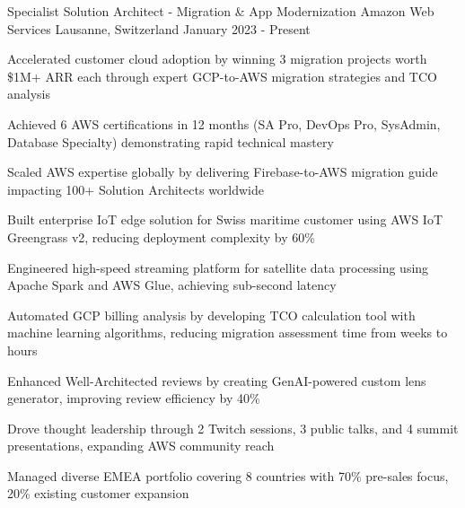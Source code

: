 \clearpage


\begin{cventries}
    \cventry
    {Specialist Solution Architect - Migration \& App Modernization} %
    {Amazon Web Services} %
    {Lausanne, Switzerland} %
    {January 2023 - Present} %
    {
        \begin{cvitems} %
		\item {Accelerated customer cloud adoption by winning 3 migration projects worth \$1M+ ARR each through expert GCP-to-AWS migration strategies and TCO analysis}
		\item {Achieved 6 AWS certifications in 12 months (SA Pro, DevOps Pro, SysAdmin, Database Specialty) demonstrating rapid technical mastery}
		\item {Scaled AWS expertise globally by delivering Firebase-to-AWS migration guide impacting 100+ Solution Architects worldwide}
		\item {Built enterprise IoT edge solution for Swiss maritime customer using AWS IoT Greengrass v2, reducing deployment complexity by 60\%}
		\item {Engineered high-speed streaming platform for satellite data processing using Apache Spark and AWS Glue, achieving sub-second latency}
		\item {Automated GCP billing analysis by developing TCO calculation tool with machine learning algorithms, reducing migration assessment time from weeks to hours}
		\item {Enhanced Well-Architected reviews by creating GenAI-powered custom lens generator, improving review efficiency by 40\%}
		\item {Drove thought leadership through 2 Twitch sessions, 3 public talks, and 4 summit presentations, expanding AWS community reach}
        \item {Managed diverse EMEA portfolio covering 8 countries with 70\% pre-sales focus, 20\% existing customer expansion}
        \end{cvitems}
}
\end{cventries}
